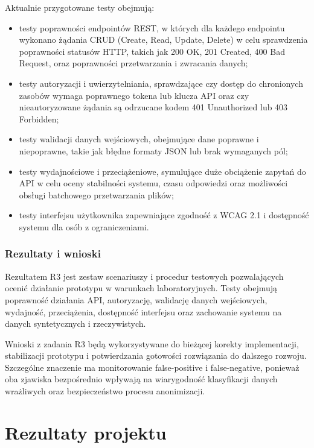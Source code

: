 \documentclass[12pt,a4paper]{report}
\begin{document}
Aktualnie przygotowane testy obejmują:

\begin{itemize}
    \item testy poprawności endpointów REST, w których dla każdego endpointu wykonano żądania CRUD (Create, Read, Update, Delete) w celu sprawdzenia poprawności statusów HTTP, takich jak 200 OK, 201 Created, 400 Bad Request, oraz poprawności przetwarzania i zwracania danych;
    \item testy autoryzacji i uwierzytelniania, sprawdzające czy dostęp do chronionych zasobów wymaga poprawnego tokena lub klucza API oraz czy nieautoryzowane żądania są odrzucane kodem 401 Unauthorized lub 403 Forbidden;
    \item testy walidacji danych wejściowych, obejmujące dane poprawne i niepoprawne, takie jak błędne formaty JSON lub brak wymaganych pól;
    \item testy wydajnościowe i przeciążeniowe, symulujące duże obciążenie zapytań do API w celu oceny stabilności systemu, czasu odpowiedzi oraz możliwości obsługi batchowego przetwarzania plików;
    \item testy interfejsu użytkownika zapewniające zgodność z WCAG 2.1 i dostępność systemu dla osób z ograniczeniami.
\end{itemize}

\subsection{Rezultaty i wnioski}
Rezultatem R3 jest zestaw scenariuszy i procedur testowych pozwalających ocenić działanie prototypu w warunkach laboratoryjnych. Testy obejmują poprawność działania API, autoryzację, walidację danych wejściowych, wydajność, przeciążenia, dostępność interfejsu oraz zachowanie systemu na danych syntetycznych i rzeczywistych.

Wnioski z zadania R3 będą wykorzystywane do bieżącej korekty implementacji, stabilizacji prototypu i potwierdzania gotowości rozwiązania do dalszego rozwoju. Szczególne znaczenie ma monitorowanie false-positive i false-negative, ponieważ oba zjawiska bezpośrednio wpływają na wiarygodność klasyfikacji danych wrażliwych oraz bezpieczeństwo procesu anonimizacji.


\chapter{Rezultaty projektu}
\end{document}
